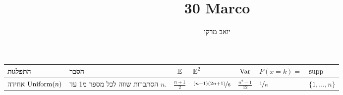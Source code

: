 \documentclass[8pt,twocolumn]{extarticle}
\title{30 Marco}
\author{יואב מרקו}
\begin{document}
\ifxetex
{\centering
  { \begin{minipage}{\columnwidth}
      \centering
      \begin{sideways}
        \begin{tabular}{ R{1.8cm} | R{2.8cm} | c | C{2cm} | c | C{2.1cm} | C{1.5cm}}
          התפלגות  & הסבר
          & $\operatorname*{\mathbb{E}}$ & $\operatorname*{\mathbb{E}}^2$ & $\operatorname{Var}$ & $P(x=k) =$ & $\operatorname{supp}$ \\
          \hline
          אחידה
          \null\hspace*{\fill}\(\operatorname{Uniform}(n)\)
                   & הסתברות שווה לכל מספר מ1 עד ‎\(n\).
          & ‎\(\frac{n+1}{2}\)
                  & ‎\(\nicefrac{(n+1)(2n+1)}{6}\)
                            & ‎\(\frac{n^2 -1}{12}\)
                                     & ‎\(\nicefrac{1}{n}\)
                                                  & ‎\(\{1, \dots ,n\}\)\\


\end{tabular}
\end{sideways}
\end{minipage}}}
\end{document}
